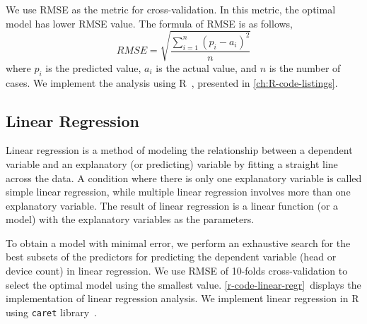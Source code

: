 We use \ac{RMSE} as the metric for cross-validation. In this metric, the optimal model has lower \ac{RMSE} value. The formula of \ac{RMSE} is as follows,
\begin{equation} \label{eq:rmse}
 RMSE=\sqrt { \frac { \sum _{ i=1 }^{ n }{ { \left( { p }_{ i }-{ a }_{ i } \right)  }^{ 2 } }  }{ n }  } 
\end{equation}
where ${ p }_{ i }$ is the predicted value, ${ a }_{ i }$ is the actual value, and $n$ is the number of cases. We implement the analysis using R~\cite{r-team}, presented in \autoref{ch:R-code-listings}.


	\subsection{Linear Regression} %
	\label{sub:linear_estimator}
	Linear regression is a method of modeling the relationship between a dependent variable and an explanatory (or predicting) variable by fitting a straight line across the data. A condition where there is only one explanatory variable is called simple linear regression, while multiple linear regression involves more than one explanatory variable. The result of linear regression is a linear function (or a model) with the explanatory variables as the parameters.

	To obtain a model with minimal error, we perform an exhaustive search for the best subsets of the predictors for predicting the dependent variable (head or device count) in linear regression. We use \ac{RMSE} of 10-folds cross-validation to select the optimal model using the smallest value. \autoref{r-code-linear-regr}~displays the implementation of linear regression analysis. We implement linear regression in R using \verb|caret| library~\cite{caret}. 
	

